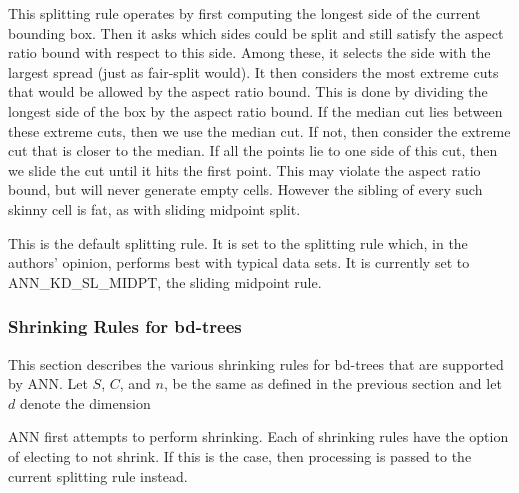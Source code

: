 \documentclass[11pt]{article}		%
\newcommand{\ANN}[0]{\textsf{ANN}}
\begin{document}
\begin{description}
	This splitting rule operates by first computing the longest side of
	the current bounding box.  Then it asks which sides could be split
	and still satisfy the aspect ratio bound with respect to this side.
	Among these, it selects the side with the largest spread (just as
	fair-split would).  It then considers the most extreme cuts that
	would be allowed by the aspect ratio bound.  This is done by
	dividing the longest side of the box by the aspect ratio bound.
	If the median cut lies between these extreme cuts, then we use the
	median cut.  If not, then consider the extreme cut that is closer
	to the median.  If all the points lie to one side of this cut, then
	we slide the cut until it hits the first point.  This may violate
	the aspect ratio bound, but will never generate empty cells.
	However the sibling of every such skinny cell is fat, as with
	sliding midpoint split.

\item[\hbox{\sf ANN\_KD\_SUGGEST:}]
	This is the default splitting rule.  It is set to the splitting
	rule which, in the authors' opinion, performs best with typical
	data sets.  It is currently set to \textsf{ANN\_KD\_SL\_MIDPT}, the
	sliding midpoint rule.
\end{description}

\subsubsection{Shrinking Rules for bd-trees}\label{shrinkrule.sec}

This section describes the various shrinking rules for bd-trees that are
supported by {\ANN}.  Let $S$, $C$, and $n$, be the same as defined in the
previous section and let $d$ denote the dimension

{\ANN} first attempts to perform shrinking.  Each of shrinking rules have the
option of electing to not shrink.  If this is the case, then processing is
passed to the current splitting rule instead.
\end{document}
